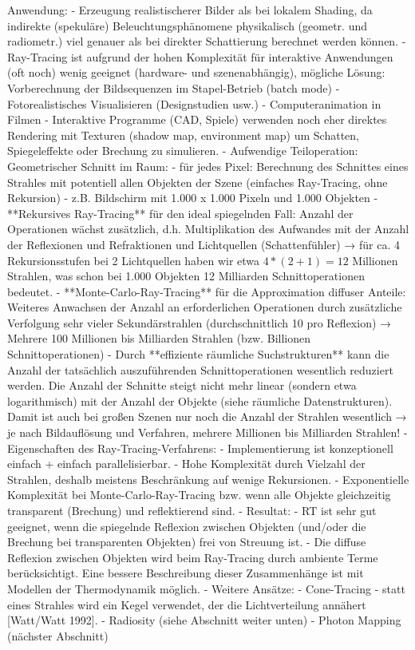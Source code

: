 \documentclass[10pt,landscape]{article}
\begin{document}
\begin{multicols}{3}
Anwendung:
- Erzeugung realistischerer Bilder als bei lokalem Shading, da indirekte (spekuläre) Beleuchtungsphänomene physikalisch (geometr. und radiometr.) viel genauer als bei direkter Schattierung berechnet werden können.
- Ray-Tracing ist aufgrund der hohen Komplexität für interaktive Anwendungen (oft noch) wenig geeignet (hardware- und szenenabhängig), mögliche Lösung: Vorberechnung der Bildsequenzen im Stapel-Betrieb (batch mode)
  - Fotorealistisches Visualisieren (Designstudien usw.)
  - Computeranimation in Filmen
- Interaktive Programme (CAD, Spiele) verwenden noch eher direktes Rendering mit Texturen (shadow map, environment map) um Schatten, Spiegeleffekte oder Brechung zu simulieren. 
- Aufwendige Teiloperation: Geometrischer Schnitt im Raum:
  - für jedes Pixel: Berechnung des Schnittes eines Strahles mit potentiell allen Objekten der Szene (einfaches Ray-Tracing, ohne Rekursion)
  - z.B. Bildschirm mit 1.000 x 1.000 Pixeln und 1.000 Objekten
  - **Rekursives Ray-Tracing** für den ideal spiegelnden Fall: Anzahl der Operationen wächst zusätzlich, d.h. Multiplikation des Aufwandes mit der Anzahl der Reflexionen und Refraktionen und Lichtquellen (Schattenfühler) → für ca. 4 Rekursionsstufen bei 2 Lichtquellen haben wir etwa $4*(2 + 1) = 12$ Millionen Strahlen, was schon bei 1.000 Objekten 12 Milliarden Schnittoperationen bedeutet.
  - **Monte-Carlo-Ray-Tracing** für die Approximation diffuser Anteile: Weiteres Anwachsen der Anzahl an erforderlichen Operationen durch zusätzliche Verfolgung sehr vieler Sekundärstrahlen (durchschnittlich 10 pro Reflexion) → Mehrere 100 Millionen bis Milliarden Strahlen (bzw. Billionen Schnittoperationen)
  - Durch **effiziente räumliche Suchstrukturen** kann die Anzahl der tatsächlich auszuführenden Schnittoperationen wesentlich reduziert werden. Die Anzahl der Schnitte steigt nicht mehr linear (sondern etwa logarithmisch) mit der Anzahl der Objekte (siehe räumliche Datenstrukturen). Damit ist auch bei großen Szenen nur noch die Anzahl der Strahlen wesentlich → je nach Bildauflösung und Verfahren, mehrere Millionen bis Milliarden Strahlen!
- Eigenschaften des Ray-Tracing-Verfahrens:
  - Implementierung ist konzeptionell einfach + einfach parallelisierbar.
  - Hohe Komplexität durch Vielzahl der Strahlen, deshalb meistens Beschränkung auf wenige Rekursionen.
  - Exponentielle Komplexität bei Monte-Carlo-Ray-Tracing bzw. wenn alle Objekte gleichzeitig transparent (Brechung) und reflektierend sind.
- Resultat:
  - RT ist sehr gut geeignet, wenn die spiegelnde Reflexion zwischen Objekten (und/oder die Brechung bei transparenten Objekten) frei von Streuung ist.
  - Die diffuse Reflexion zwischen Objekten wird beim Ray-Tracing durch ambiente Terme berücksichtigt. Eine bessere Beschreibung dieser Zusammenhänge ist mit Modellen der Thermodynamik möglich.
- Weitere Ansätze:
  - Cone-Tracing - statt eines Strahles wird ein Kegel verwendet, der die Lichtverteilung annähert [Watt/Watt 1992].
  - Radiosity (siehe Abschnitt weiter unten)
  - Photon Mapping (nächster Abschnitt)


\end{multicols}
\end{document}
